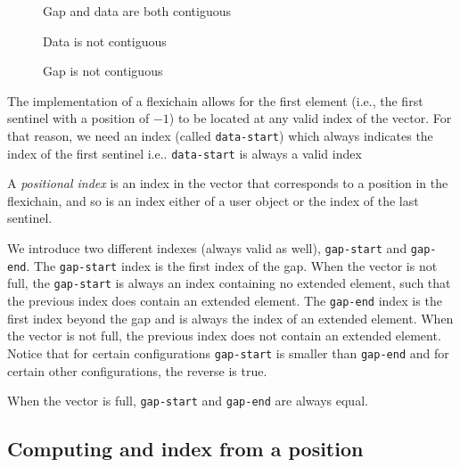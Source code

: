 \documentclass[11pt]{article}
\def\inputfig#1{}
\begin{document}
\begin{figure}
\begin{center}
\inputfig{gap1.pdf_t}
\end{center}
\caption{\label{fig-both-contiguous} Gap and data are both contiguous}
\end{figure}

\begin{figure}
\begin{center}
\inputfig{gap2.pdf_t}
\end{center}
\caption{\label{fig-data-not-contiguous} Data is not contiguous}
\end{figure}

\begin{figure}
\begin{center}
\inputfig{gap3.pdf_t}
\end{center}
\caption{\label{fig-gap-not-contiguous} Gap is not contiguous}
\end{figure}

The implementation of a flexichain allows for the first element (i.e.,
the first sentinel with a position of $-1$) to be located at any valid
index of the vector.  For that reason, we need an index (called
\texttt{data-start}) which always indicates the index of the first
sentinel i.e.. \texttt{data-start} is always a valid index

A \textit{positional index} is an index in the vector that corresponds
to a position in the flexichain, and so is an index either of a user
object or the index of the last sentinel.

We introduce two different indexes (always valid as well),
\texttt{gap-start} and \texttt{gap-end}.  The \texttt{gap-start} index
is the first index of the gap.  When the vector is not full, the
\texttt{gap-start} is always an index containing no extended element,
such that the previous index does contain an extended element. The
\texttt{gap-end} index is the first index beyond the gap and is always
the index of an extended element.  When the vector is not full, the
previous index does not contain an extended element.  Notice that for
certain configurations \texttt{gap-start} is smaller than
\texttt{gap-end} and for certain other configurations, the reverse is
true.

When the vector is full, \texttt{gap-start} and \texttt{gap-end} are
always equal.

\subsection{Computing and index from a position}
\end{document}
